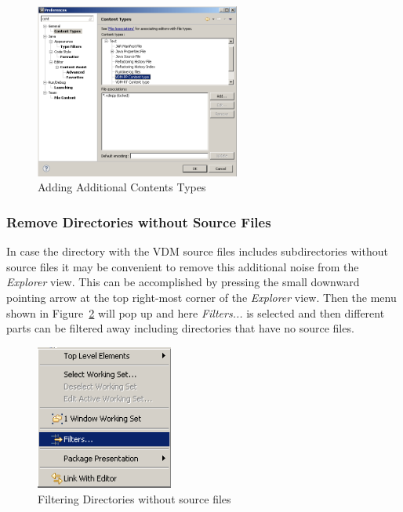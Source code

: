 \documentclass{overturerepsec}
\begin{document}
\begin{figure}[!htb]
\begin{center}
\includegraphics[width=0.6\textwidth]{screenDumps/contentstypes}
\caption{Adding Additional Contents Types\label{fig:ContentsTypes}}
\end{center}
\end{figure}

\subsubsection{Remove Directories without Source Files}

In case the directory with the VDM source files includes
subdirectories without source files it may be convenient to remove
this additional noise from the \emph{Explorer} view. This can be
accomplished by pressing the small downward pointing arrow at the top
right-most corner of the \emph{Explorer} view. Then the menu shown in
Figure~\ref{fig:filteringfiles} will pop up and here \emph{Filters...}
is selected and then different parts can be filtered away including
directories that have no source files.

\begin{figure}[!htb]
\begin{center}
\includegraphics[width=0.4\textwidth]{screenDumps/filteringfiles}
\caption{Filtering Directories without source files\label{fig:filteringfiles}}
\end{center}
\end{figure}
\end{document}
